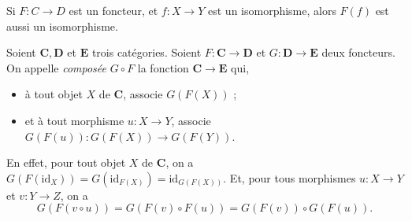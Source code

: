 \begin{rmk}
  Si $F : C \to D$ est un foncteur, et $f : X \to Y$ est un isomorphisme,
  alors $F(f)$ est aussi un isomorphisme.
\end{rmk}

\begin{defn}
  Soient $\mathbf{C}, \mathbf{D}$ et $\mathbf{E}$ trois catégories.
  Soient $F : \mathbf{C} \to \mathbf{D}$ et $G : \mathbf{D} \to \mathbf{E}$ deux foncteurs.
  On appelle \textit{composée} $G \circ F$ la fonction  $\mathbf{C} \to \mathbf{E}$ qui, 
  \begin{itemize}
    \item à tout objet $X$ de $\mathbf{C}$, associe $G(F(X))$ ;
    \item et à tout morphisme $u : X \to Y$, associe $G(F(u)) : G(F(X)) \to G(F(Y))$.
  \end{itemize}

  En effet, pour tout objet $X$ de $\mathbf{C}$, on a $G(F(\mathrm{id}_X)) = G(\mathrm{id}_{F(X)}) = \mathrm{id}_{G(F(X))}$.
  Et, pour tous morphismes $u : X \to Y$ et $v : Y \to Z$, on a \[
    G(F(v \circ u)) = G(F(v) \circ F(u)) = G(F(v)) \circ G(F(u))
  .\]
\end{defn}

